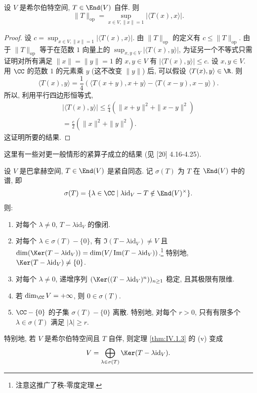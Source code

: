 \begin{lemma}[自伴算子的范数]
\label{lem:IV.1.4}
设 $V$ 是希尔伯特空间, $T \in \End(V)$ 自伴. 则
\[
\|T\|_{\mathrm{op}} = \sup_{x \in V, \|x\| = 1}|\langle T(x), x \rangle|.
\]
\end{lemma}

\begin{proof}
设 $c = \sup_{x \in V, \|x\| = 1}|\langle T(x), x \rangle|$. 由 $\|T\|_{\mathrm{op}}$ 的定义有 $c \leq \|T\|_{\mathrm{op}}$. 由于 $\|T\|_{\mathrm{op}}$ 等于在范数 $1$ 向量上的 $\sup_{x,y \in V}|\langle T(x), y \rangle|$, 为证另一个不等式只需证明对所有满足 $\|x\| = \|y\| = 1$ 的 $x, y \in V$ 有 $|\langle T(x), y \rangle| \leq c$. 设 $x, y \in V$. 用 $\CC$ 的范数 $1$ 的元素乘 $y$ (这不改变 $\|y\|$) 后, 可以假设 $\langle T(x), y \rangle \in \R$. 则
\[
\langle T(x), y \rangle = \frac{1}{4}(\langle T(x + y), x + y \rangle - \langle T(x - y), x - y \rangle).
\]
所以, 利用平行四边形恒等式,
\begin{multline*}
|\langle T(x), y \rangle| \leq \frac{c}{4}(\|x + y\|^2 + \|x - y\|^2) \\
= \frac{c}{2}(\|x\|^2 + \|y\|^2).
\end{multline*}
这证明所要的结果.
\end{proof}

这里有一些对更一般情形的紧算子成立的结果 (见 {[}20{]} 4.16-4.25).

\begin{theorem}[紧算子谱的性质]
\label{thm:IV.1.5}
设 $V$ 是巴拿赫空间, $T \in \End(V)$ 是紧自同态. 记 $\sigma(T)$ 为 $T$ 在 $\End(V)$ 中的谱, 即
\[
\sigma(T) = \{\lambda \in \CC \mid \lambda\mathrm{id}_V - T \notin \End(V)^{\times}\}.
\]
则:
\begin{enumerate}
\item[(i)] 对每个 $\lambda \neq 0$, $T - \lambda\mathrm{id}_V$ 的像闭.
\item[(ii)] 对每个 $\lambda \in \sigma(T) - \{0\}$, 有 $\Im(T - \lambda\mathrm{id}_V) \neq V$ 且 $\dim(\Ker(T - \lambda\mathrm{id}_V)) = \dim(V/\Im(T - \lambda\mathrm{id}_V))$.\footnote{注意这推广了秩-零度定理.} 特别地, $\Ker(T - \lambda\mathrm{id}_V) \neq \{0\}$.
\item[(iii)] 对每个 $\lambda \neq 0$, 递增序列 $(\Ker((T - \lambda\mathrm{id}_V)^n))_{n \geq 1}$ 稳定, 且其极限有限维.
\item[(iv)] 若 $\dim_{\CC}V = +\infty$, 则 $0 \in \sigma(T)$.
\item[(v)] $\CC - \{0\}$ 的子集 $\sigma(T) - \{0\}$ 离散. 特别地, 对每个 $r > 0$, 只有有限多个 $\lambda \in \sigma(T)$ 满足 $|\lambda| \geq r$.
\end{enumerate}
特别地, 若 $V$ 是希尔伯特空间且 $T$ 自伴, 则定理 \ref{thm:IV.1.3} 的 (v) 变成
\[
V = \bigoplus_{\lambda \in \sigma(T)}\Ker(T - \lambda\mathrm{id}_V).
\]
\end{theorem}

